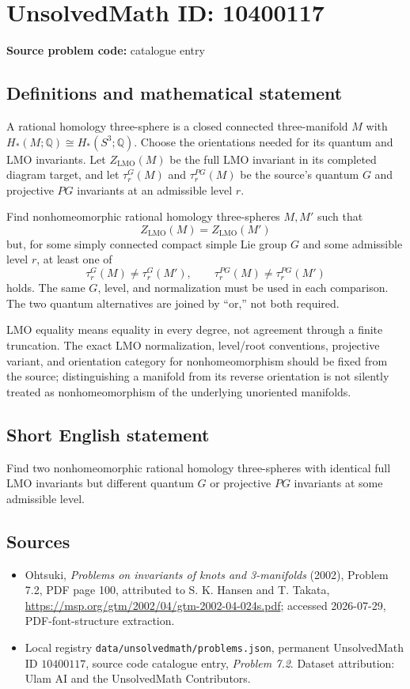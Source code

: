 \documentclass[11pt]{article}
\begin{document}
\section*{UnsolvedMath ID: 10400117}
\textbf{Source problem code:} catalogue entry
\subsection{Definitions and mathematical statement}
A rational homology three-sphere is a closed connected three-manifold $M$ with $H_*(M;\mathbb Q)\cong H_*(S^3;\mathbb Q)$. Choose the orientations needed for its quantum and LMO invariants. Let $Z_{\mathrm{LMO}}(M)$ be the full LMO invariant in its completed diagram target, and let $\tau_r^G(M)$ and $\tau_r^{PG}(M)$ be the source's quantum $G$ and projective $PG$ invariants at an admissible level $r$.

Find nonhomeomorphic rational homology three-spheres $M,M'$ such that
\[
Z_{\mathrm{LMO}}(M)=Z_{\mathrm{LMO}}(M')
\]
but, for some simply connected compact simple Lie group $G$ and some admissible level $r$, at least one of
\[
\tau_r^G(M)\ne\tau_r^G(M'),\qquad
\tau_r^{PG}(M)\ne\tau_r^{PG}(M')
\]
holds. The same $G$, level, and normalization must be used in each comparison. The two quantum alternatives are joined by ``or,'' not both required.

LMO equality means equality in every degree, not agreement through a finite truncation. The exact LMO normalization, level/root conventions, projective variant, and orientation category for nonhomeomorphism should be fixed from the source; distinguishing a manifold from its reverse orientation is not silently treated as nonhomeomorphism of the underlying unoriented manifolds.
\subsection{Short English statement}
Find two nonhomeomorphic rational homology three-spheres with identical full LMO invariants but different quantum $G$ or projective $PG$ invariants at some admissible level.
\subsection{Sources}
\begin{itemize}
\item Ohtsuki, \emph{Problems on invariants of knots and 3-manifolds} (2002), Problem 7.2, PDF page 100, attributed to S. K. Hansen and T. Takata, \url{https://msp.org/gtm/2002/04/gtm-2002-04-024s.pdf}; accessed 2026-07-29, PDF-font-structure extraction.
\item Local registry \texttt{data/unsolvedmath/problems.json}, permanent UnsolvedMath ID $10400117$, source code catalogue entry, \emph{Problem 7.2}. Dataset attribution: Ulam AI and the UnsolvedMath Contributors.
\end{itemize}
\end{document}
